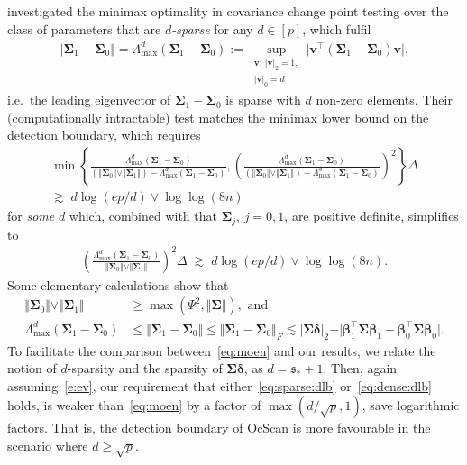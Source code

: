 \documentclass[11pt, a4paper]{article}
\newcommand{\mbf}{\mathbf}
\renewcommand{\l}{\left}
\renewcommand{\r}{\right}
\newcommand{\nn}{\nonumber}
\theoremstyle{definition}
\theoremstyle{definition}
\theoremstyle{definition}
\theoremstyle{definition}
\theoremstyle{definition}
\theoremstyle{remark}
\theoremstyle{definition}
\theoremstyle{definition}
\theoremstyle{definition}
\begin{document}
\cite{moen2024minimax} investigated the minimax optimality in covariance change point testing over the class of parameters that are \textit{$d$-sparse} for any $d \in [p]$, which fulfil
\begin{align*}
\Vert \bm\Sigma_1 - \bm\Sigma_0 \Vert = \Lambda^d_{\max}(\bm\Sigma_1 - \bm\Sigma_0) := \sup_{\substack{\mbf v: \, \vert \mbf v \vert_2 = 1, \\ \vert \mbf v \vert_0 = d}} \vert \mbf v^\top (\bm\Sigma_1 - \bm\Sigma_0) \mbf v \vert,
\end{align*}
i.e.\ the leading eigenvector of $\bm\Sigma_1 - \bm\Sigma_0$ is sparse with $d$ non-zero elements.
Their (computationally intractable) test matches the minimax lower bound on the detection boundary, which requires
\begin{align}
\min\l\{\frac{\Lambda^d_{\max}(\bm\Sigma_1 - \bm\Sigma_0)}{(\Vert \bm\Sigma_0 \Vert \vee \Vert \bm\Sigma_1 \Vert) - \Lambda^d_{\max}(\bm\Sigma_1 - \bm\Sigma_0)}, \l( \frac{\Lambda^d_{\max}(\bm\Sigma_1 - \bm\Sigma_0)}{(\Vert \bm\Sigma_0 \Vert \vee \Vert \bm\Sigma_1 \Vert) - \Lambda^d_{\max}(\bm\Sigma_1 - \bm\Sigma_0)} \r)^2 \r\} \Delta
\nn \\
\gtrsim\; d\log(ep/d) \vee \log\log(8n)
\nn
\end{align}
for \textit{some} $d$ which, combined with that $\bm\Sigma_j, \, j = 0, 1$, are positive definite, simplifies to
\begin{align}
\l( \frac{\Lambda^d_{\max}(\bm\Sigma_1 - \bm\Sigma_0)}{\Vert \bm\Sigma_0 \Vert \vee \Vert \bm\Sigma_1 \Vert} \r)^2 \Delta\; \gtrsim\; d\log(ep/d) \vee \log\log(8n).
\label{eq:moen}
\end{align}
Some elementary calculations show that
\begin{align*}
\Vert \bm\Sigma_0 \Vert \vee \Vert \bm\Sigma_1 \Vert & \ge \max(\Psi^2, \Vert \bm\Sigma \Vert), \text{ \ and }
\\
\Lambda^d_{\max}(\bm\Sigma_1 - \bm\Sigma_0) & \le \Vert \bm\Sigma_1 - \bm\Sigma_0 \Vert \le \Vert \bm\Sigma_1 - \bm\Sigma_0 \Vert_F \lesssim \vert \bm\Sigma \bm\delta \vert_2 + \vert \bm\beta_1^\top \bm\Sigma \bm\beta_1 - \bm\beta_0^\top \bm\Sigma \bm\beta_0 \vert.
\end{align*}
To facilitate the comparison between~\eqref{eq:moen} and our results, we relate the notion of $d$-sparsity and the sparsity of $\bm\Sigma \bm\delta$, as $d = \mathfrak{s}_* + 1$.
Then, again assuming~\eqref{e:ev}, our requirement that either~\eqref{eq:sparse:dlb} or~\eqref{eq:dense:dlb} holds, is weaker than~\eqref{eq:moen} by a factor of $\max(d/\sqrt{p}, 1)$, save logarithmic factors. 
That is, the detection boundary of OcScan is more favourable in the scenario where $d \ge \sqrt{p}$. 
\end{document}
